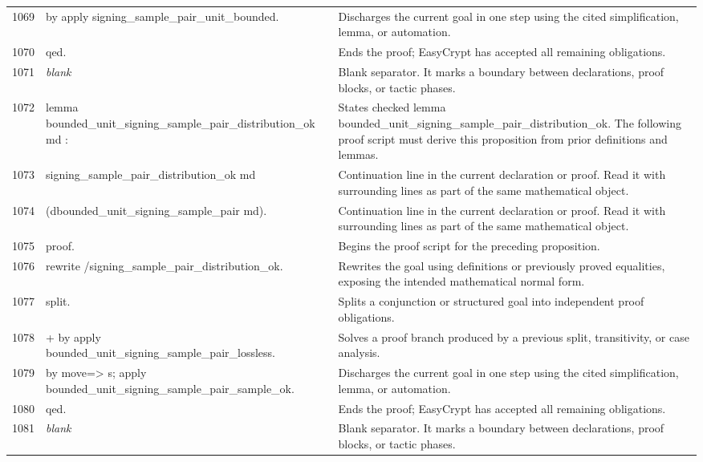 \documentclass[10pt]{article}
\begin{document}
\begin{longtable}{r L{0.53\textwidth} L{0.37\textwidth}}
1069 & {\ttfamily\scriptsize by apply signing\_sample\_pair\_unit\_bounded.} & Discharges the current goal in one step using the cited simplification, lemma, or automation. \\
1070 & {\ttfamily\scriptsize qed.} & Ends the proof; EasyCrypt has accepted all remaining obligations. \\
1071 & {\ttfamily\scriptsize \emph{blank}} & Blank separator.  It marks a boundary between declarations, proof blocks, or tactic phases. \\
1072 & {\ttfamily\scriptsize lemma bounded\_unit\_signing\_sample\_pair\_distribution\_ok md :} & States checked lemma bounded\_unit\_signing\_sample\_pair\_distribution\_ok.  The following proof script must derive this proposition from prior definitions and lemmas. \\
1073 & {\ttfamily\scriptsize   signing\_sample\_pair\_distribution\_ok md} & Continuation line in the current declaration or proof.  Read it with surrounding lines as part of the same mathematical object. \\
1074 & {\ttfamily\scriptsize     (dbounded\_unit\_signing\_sample\_pair md).} & Continuation line in the current declaration or proof.  Read it with surrounding lines as part of the same mathematical object. \\
1075 & {\ttfamily\scriptsize proof.} & Begins the proof script for the preceding proposition. \\
1076 & {\ttfamily\scriptsize rewrite /signing\_sample\_pair\_distribution\_ok.} & Rewrites the goal using definitions or previously proved equalities, exposing the intended mathematical normal form. \\
1077 & {\ttfamily\scriptsize split.} & Splits a conjunction or structured goal into independent proof obligations. \\
1078 & {\ttfamily\scriptsize + by apply bounded\_unit\_signing\_sample\_pair\_lossless.} & Solves a proof branch produced by a previous split, transitivity, or case analysis. \\
1079 & {\ttfamily\scriptsize by move=> s; apply bounded\_unit\_signing\_sample\_pair\_sample\_ok.} & Discharges the current goal in one step using the cited simplification, lemma, or automation. \\
1080 & {\ttfamily\scriptsize qed.} & Ends the proof; EasyCrypt has accepted all remaining obligations. \\
1081 & {\ttfamily\scriptsize \emph{blank}} & Blank separator.  It marks a boundary between declarations, proof blocks, or tactic phases. \\

\end{longtable}
\end{document}
